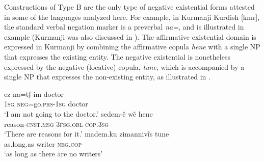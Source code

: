 ﻿\documentclass[output=paper]{langsci/langscibook}
\begin{document}
Constructions of Type B are the only type of negative existential forms
attested in some of the languages analyzed here. For example, in
Kurmanji Kurdish [kmr], the standard verbal negation marker is
a preverbal \textit{na=}, and is illustrated in example
 (Kurmanji was also discussed in
). The affirmative existential domain is expressed in
Kurmanji by combining the affirmative copula \textit{hene} with a single NP
that expresses the existing entity. The negative existential is nonetheless
expressed by the negative (locative) copula, \textit{tune}, which is
accompanied by a single NP that expresses the non-existing entity, as
illustrated in .
%
\begin{exe}\ex
{}
\begin{xlist}
\ex\label{ex:ieur-kurmanji-doctor}
    \gll ez na=tʃ-im doctor \\
\textsc{1sg}   \textsc{neg}=go.\textsc{prs-1sg}    doctor \\
    \glt `I am not going to the doctor.'
\ex
\gll sedem-ê wê hene\\
reason-\textsc{cnst}.\textsc{msg}   \textsc{3fsg}.\textsc{obl}
\textsc{cop}.\textsc{3sg}\\
\glt `There are reasons for it.'
\ex\label{ex:ieur-kurmanji-nowriters}
\gll madem.ku zimannivîs tune \\
as.long.as  writer \textsc{neg.cop}\\
\glt `as long as there are no writers'
\end{xlist}\end{exe}
\end{document}
